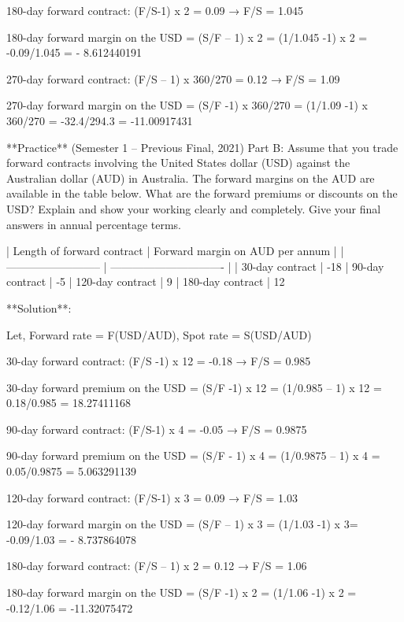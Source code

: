180-day forward contract: (F/S-1) x 2 = 0.09 → F/S = 1.045

180-day forward margin on the USD = (S/F – 1) x 2 = (1/1.045 -1) x 2 = -0.09/1.045 = - 8.612440191 %

270-day forward contract: (F/S – 1) x 360/270 = 0.12 → F/S = 1.09

270-day forward margin on the USD = (S/F -1) x 360/270 = (1/1.09 -1) x 360/270 = -32.4/294.3 = -11.00917431%

**Practice** (Semester 1 -- Previous Final, 2021) Part B: Assume that you trade forward contracts involving the United States dollar (USD) against the Australian dollar (AUD) in Australia. The forward margins on the AUD are available in the table below. What are the forward premiums or discounts on the USD? Explain and show your working clearly and completely. Give your final answers in annual percentage terms.

| Length of forward contract | Forward margin on AUD per annum |
| -------------------------- | ------------------------------- |
| 30-day contract            | -18%
| 90-day contract            | -5%
| 120-day contract           | 9%
| 180-day contract           | 12%

**Solution**:

Let, Forward rate = F(USD/AUD), Spot rate = S(USD/AUD)

30-day forward contract: (F/S -1) x 12 = -0.18 → F/S = 0.985

30-day forward premium on the USD = (S/F -1) x 12 = (1/0.985 – 1) x 12 = 0.18/0.985 = 18.27411168 %

90-day forward contract: (F/S-1) x 4 = -0.05 → F/S = 0.9875

90-day forward premium on the USD = (S/F - 1) x 4 = (1/0.9875 – 1) x 4 = 0.05/0.9875 = 5.063291139 %

120-day forward contract: (F/S-1) x 3 = 0.09 → F/S = 1.03

120-day forward margin on the USD = (S/F – 1) x 3 = (1/1.03 -1) x 3= -0.09/1.03 = - 8.737864078 %

180-day forward contract: (F/S – 1) x 2 = 0.12 → F/S = 1.06

180-day forward margin on the USD = (S/F -1) x 2 = (1/1.06 -1) x 2 = -0.12/1.06 = -11.32075472%


